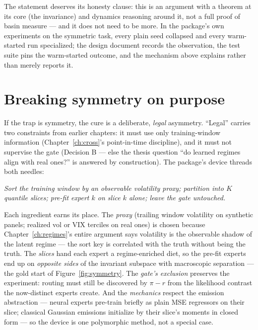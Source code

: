 The statement deserves its honesty clause: this is an argument with a
theorem at its core (the invariance) and dynamics reasoning around it,
not a full proof of basin measure --- and it does not need to be more.
In the package's own experiments on the symmetric task, every plain
seed collapsed and every warm-started run specialized; the design
document records the observation, the test suite pins the warm-started
outcome, and the mechanism above explains rather than merely reports
it.

\section{Breaking symmetry on purpose}\label{sec:warmstart}

If the trap is symmetry, the cure is a deliberate, \emph{legal}
asymmetry. ``Legal'' carries two constraints from earlier chapters: it
must use only training-window information (Chapter~\ref{ch:cross}'s
point-in-time discipline), and it must not supervise the gate (Decision
B --- else the thesis question ``do learned regimes align with real
ones?'' is answered by construction). The package's device threads
both needles:

\begin{center}
\emph{Sort the training window by an observable volatility proxy;
partition into $K$ quantile slices; pre-fit expert $k$ on slice $k$
alone; leave the gate untouched.}
\end{center}

Each ingredient earns its place. The \emph{proxy} (trailing window
volatility on synthetic panels; realized vol or VIX terciles on real
ones) is chosen because Chapter~\ref{ch:regimes}'s entire argument says
volatility is the observable shadow of the latent regime --- the sort
key is correlated with the truth without being the truth. The
\emph{slices} hand each expert a regime-enriched diet, so the pre-fit
experts end up on \emph{opposite sides} of the invariant subspace with
macroscopic separation --- the gold start of
Figure~\ref{fig:symmetry}. The \emph{gate's exclusion} preserves the
experiment: routing must still be discovered by $\pi - r$ from the
likelihood contrast the now-distinct experts create. And the
\emph{mechanics} respect the emission abstraction --- neural experts
pre-train briefly as plain MSE regressors on their slice; classical
Gaussian emissions initialize by their slice's moments in closed form
--- so the device is one polymorphic method, not a special case.

